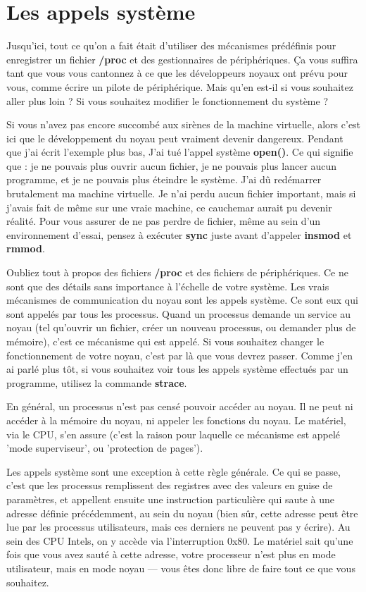 \documentclass[11pt]{article}
\begin{document}
\section*{Les appels système}
\label{sec-10}

Jusqu'ici, tout ce qu'on a fait était d'utiliser des mécanismes prédéfinis pour enregistrer un fichier \textbf{/proc} et des gestionnaires de périphériques. Ça vous suffira tant que vous vous cantonnez à ce que les développeurs noyaux ont prévu pour vous, comme écrire un pilote de périphérique. Mais qu'en est-il si vous souhaitez aller plus loin ? Si vous souhaitez modifier le fonctionnement du système ?

Si vous n'avez pas encore succombé aux sirènes de la machine virtuelle, alors c'est ici que le développement du noyau peut vraiment devenir dangereux. Pendant que j'ai écrit l'exemple plus bas, J'ai tué l'appel système \textbf{open()}. Ce qui signifie que : je ne pouvais plus ouvrir aucun fichier, je ne pouvais plus lancer aucun programme, et je ne pouvais plus éteindre le système. J'ai dû redémarrer brutalement ma machine virtuelle. Je n'ai perdu aucun fichier important, mais si j'avais fait de même sur une vraie machine, ce cauchemar aurait pu devenir réalité. Pour vous assurer de ne pas perdre de fichier, même au sein d'un environnement d'essai, pensez à exécuter \textbf{sync} juste avant d'appeler \textbf{insmod} et \textbf{rmmod}.

Oubliez tout à propos des fichiers \textbf{/proc} et des fichiers de périphériques. Ce ne sont que des détails sans importance à l'échelle de votre système. Les vrais mécanismes de communication du noyau sont les appels système. Ce sont eux qui sont appelés par tous les processus. Quand un processus demande un service au noyau (tel qu'ouvrir un fichier, créer un nouveau processus, ou demander plus de mémoire), c'est ce mécanisme qui est appelé. Si vous souhaitez changer le fonctionnement de votre noyau, c'est par là que vous devrez passer. Comme j'en ai parlé plus tôt, si vous souhaitez voir tous les appels système effectués par un programme, utilisez la commande \textbf{strace}.

En général, un processus n'est pas censé pouvoir accéder au noyau. Il ne peut ni accéder à la mémoire du noyau, ni appeler les fonctions du noyau. Le matériel, via le CPU, s'en assure (c'est la raison pour laquelle ce mécanisme est appelé 'mode superviseur', ou 'protection de pages').

Les appels système sont une exception à cette règle générale. Ce qui se passe, c'est que les processus remplissent des registres avec des valeurs en guise de paramètres, et appellent ensuite une instruction particulière qui saute à une adresse définie précédemment, au sein du noyau (bien sûr, cette adresse peut être lue par les processus utilisateurs, mais ces derniers ne peuvent pas y écrire). Au sein des CPU Intels, on y accède via l'interruption 0x80. Le matériel sait qu'une fois que vous avez sauté à cette adresse, votre processeur n'est plus en mode utilisateur, mais en mode noyau --- vous êtes donc libre de faire tout ce que vous souhaitez.
\end{document}
